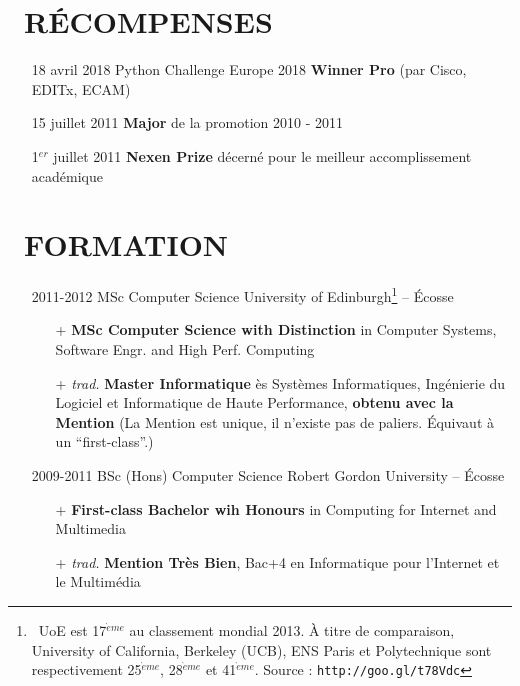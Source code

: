 \documentclass{res}
\begin{document}
\begin{resume}
\section{\faMedal~R\'ECOMPENSES}
    \begin{itemize}
        \item[] 18 avril 2018 \tabto{4cm} Python Challenge Europe 2018 \textbf{Winner Pro} (par Cisco, EDITx, ECAM)
        \item[] 15 juillet 2011 \tabto{4cm} \textbf{Major} de la promotion 2010 - 2011
        \item[] 1$^{er}$ juillet 2011 \tabto{4cm} \textbf{Nexen Prize} d\'ecern\'e pour le meilleur accomplissement acad\'emique
    \end{itemize}

\section{\faGraduationCap~FORMATION}
    \begin{itemize}
    \item[] 2011-2012 \tabto{2cm} MSc Computer Science \hfill University of Edinburgh\footnote{~UoE est 17$^{\grave{e}me}$ au classement mondial 2013. \`A titre de comparaison, University of California, Berkeley (UCB), ENS Paris et Polytechnique sont respectivement 25$^{\grave{e}me}$, 28$^{\grave{e}me}$ et 41$^{\grave{e}me}$. Source : \texttt{http://goo.gl/t78Vdc}} -- \'Ecosse
        \begin{itemize}
            \item[+] \textbf{MSc Computer Science with Distinction} in Computer Systems, Software Engr. and High Perf. Computing
            \item[+] \textit{trad.} \textbf{Master Informatique} \`es Syst\`emes Informatiques, Ing\'enierie du Logiciel et Informatique de Haute Performance, \textbf{obtenu avec la Mention} (La Mention est unique, il n'existe pas de paliers. \'Equivaut \`a un ``first-class''.)
        \end{itemize}

    \item[] 2009-2011 \tabto{2cm} BSc (Hons) Computer Science \hfill Robert Gordon University -- \'Ecosse
        \begin{itemize}
            \item[+] \textbf{First-class Bachelor wih Honours} in Computing for Internet and Multimedia
            \item[+] \textit{trad.} \textbf{Mention Tr\`es Bien}, Bac+4 en Informatique pour l'Internet et le Multim\'edia
        \end{itemize}


\end{itemize}
\end{resume}
\end{document}
